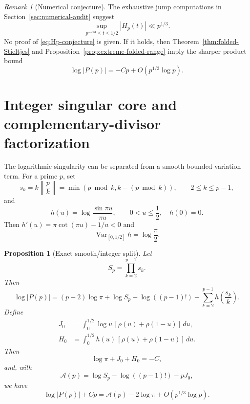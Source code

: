 \documentclass[11pt]{amsart}
\numberwithin{equation}{section}
\newtheorem{proposition}[theorem]{Proposition}
\theoremstyle{definition}
\theoremstyle{remark}
\newtheorem{remark}[theorem]{Remark}
\begin{document}
\begin{remark}[Numerical conjecture]\label{rem:Hp-conjecture}
The exhaustive jump computations in Section~\ref{sec:numerical-audit}
suggest
\begin{equation}\label{eq:Hp-conjecture}
 \sup_{p^{-2/3}\le t\le1/2}|H_p(t)|\ll p^{1/3}.
\end{equation}
No proof of \eqref{eq:Hp-conjecture} is given.  If it holds, then
Theorem~\ref{thm:folded-Stieltjes} and
Proposition~\ref{prop:extreme-folded-range} imply the sharper product bound
\begin{equation}\label{eq:Hp-conjecture-consequence}
 \log|P(p)|=-Cp+O(p^{1/3}\log p).
\end{equation}
\end{remark}

\section{Integer singular core and complementary-divisor factorization}
\label{sec:integer-core}

The logarithmic singularity can be separated from a smooth
bounded-variation term.  For a prime \(p\), set
\begin{equation}\label{eq:sk-def}
 s_k=k\left\|\frac pk\right\|
 =\min(p\bmod k,k-(p\bmod k)),
 \qquad 2\le k\le p-1,
\end{equation}
and
\begin{equation}\label{eq:h-def}
 h(u)=\log\frac{\sin\pi u}{\pi u},\qquad 0<u\le\frac12,
 \quad h(0)=0.
\end{equation}
Then \(h'(u)=\pi\cot(\pi u)-1/u<0\) and
\begin{equation}\label{eq:h-variation}
 \operatorname{Var}_{[0,1/2]}h=\log\frac\pi2.
\end{equation}

\begin{proposition}[Exact smooth/integer split]\label{prop:integer-split}
Let
\begin{equation}\label{eq:Sp-def}
 S_p=\prod_{k=2}^{p-1}s_k.
\end{equation}
Then
\begin{equation}\label{eq:integer-split}
 \log|P(p)|=(p-2)\log\pi+\log S_p-\log((p-1)!)
 +\sum_{k=2}^{p-1}h\!\left(\frac{s_k}{k}\right).
\end{equation}
Define
\begin{align}
 J_0&=\int_0^{1/2}\log u\,[\rho(u)+\rho(1-u)]\,du,
 \label{eq:J0-def}\\
 H_0&=\int_0^{1/2}h(u)\,[\rho(u)+\rho(1-u)]\,du.
 \label{eq:H0-def}
\end{align}
Then
\begin{equation}\label{eq:C-JH}
 \log\pi+J_0+H_0=-C,
\end{equation}
and, with
\begin{equation}\label{eq:Acore-def}
 \mathcal A(p)=\log S_p-\log((p-1)!)-pJ_0,
\end{equation}
we have
\begin{equation}\label{eq:Acore-isolation}
 \log|P(p)|+Cp
 =\mathcal A(p)-2\log\pi+O(p^{1/3}\log p).
\end{equation}
\end{proposition}
\end{document}
